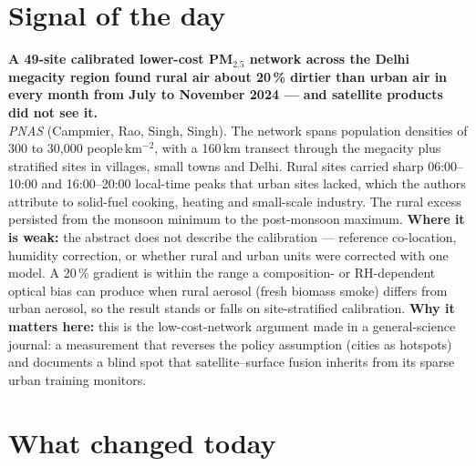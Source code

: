\documentclass[10pt]{article}
\begin{document}
\vspace{6mm}

\section*{\sffamily\bfseries\color{Deep}Signal of the day}
\vspace{-1.5mm}{\color{Amber}\rule{\linewidth}{1.1pt}}\vspace{2.5mm}

\begin{keybox}
{\sffamily\bfseries\small\color{Deep}A 49-site calibrated lower-cost PM$_{2.5}$ network across the Delhi megacity region found rural air about 20\,\% dirtier than urban air in every month from July to November 2024 --- and satellite products did not see it.}\\[1.4mm]
\footnotesize
\textit{PNAS} (Campmier, Rao, Singh, Singh). The network spans population densities of 300 to 30,000 people\,km$^{-2}$, with a 160\,km transect through the megacity plus stratified sites in villages, small towns and Delhi. Rural sites carried sharp 06:00--10:00 and 16:00--20:00 local-time peaks that urban sites lacked, which the authors attribute to solid-fuel cooking, heating and small-scale industry. The rural excess persisted from the monsoon minimum to the post-monsoon maximum.
\textbf{Where it is weak:} the abstract does not describe the calibration --- reference co-location, humidity correction, or whether rural and urban units were corrected with one model. A 20\,\% gradient is within the range a composition- or RH-dependent optical bias can produce when rural aerosol (fresh biomass smoke) differs from urban aerosol, so the result stands or falls on site-stratified calibration.
\textbf{Why it matters here:} this is the low-cost-network argument made in a general-science journal: a measurement that reverses the policy assumption (cities as hotspots) and documents a blind spot that satellite--surface fusion inherits from its sparse urban training monitors.\par
\end{keybox}

\vspace{3mm}

\section*{\sffamily\bfseries\color{Deep}What changed today}
\vspace{-1.5mm}{\color{Amber}\rule{\linewidth}{1.1pt}}\vspace{2.5mm}
\end{document}
